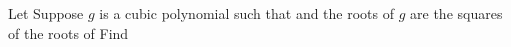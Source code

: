 Let  Suppose $ g$ is a cubic polynomial such that  and the roots of $ g$ are the squares of the roots of  Find 